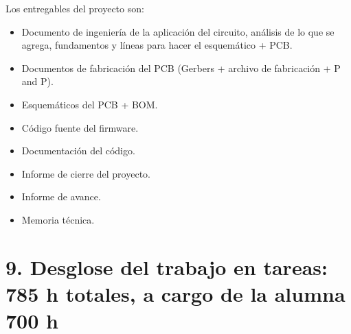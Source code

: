 \documentclass[
11pt, %
]{charter}
\begin{document}
Los entregables del proyecto son:

\begin{itemize}
	\item Documento de ingeniería de la aplicación del circuito, análisis de lo que se agrega, fundamentos y líneas para hacer el esquemático + PCB.
    \item Documentos de fabricación del PCB (Gerbers + archivo de fabricación + P and P).
    \item Esquemáticos del PCB + BOM.
	\item Código fuente del firmware.
	\item Documentación del código.
	\item Informe de cierre del proyecto.
	\item Informe de avance.
	\item Memoria técnica.

\end{itemize}


\section{9. Desglose del trabajo en tareas: 785 h totales, a cargo de la alumna 700 h } 
\label{sec:wbs}
\end{document}
